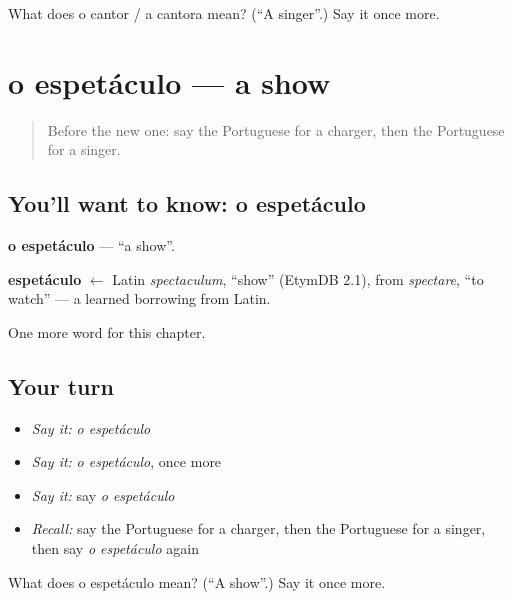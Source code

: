 \begin{tcolorbox}[breakable,colback=teal!4,colframe=teal!35!black,title={Before you move on}]
What does o cantor / a cantora mean? (\textquotedblleft{}A singer\textquotedblright{}.) Say it once more.
\end{tcolorbox}
\section[o espetáculo]{o espetáculo — a show}

\label{lesson:PT-C159-espetaculo}



\begin{quote}
Before the new one: say the Portuguese for a charger, then the Portuguese for a singer.
\end{quote}

\subsection*{You'll want to know: o espetáculo}
\textbf{o espetáculo} — \textquotedblleft{}a show\textquotedblright{}.

\begin{cousinweb}
\textbf{espetáculo} $\leftarrow$ Latin \emph{spectaculum}, \textquotedblleft{}show\textquotedblright{} (EtymDB 2.1), from \emph{spectare}, \textquotedblleft{}to watch\textquotedblright{} — a learned borrowing from Latin.
\end{cousinweb}

\begin{grammarlens}[title={What you've built}]
One more word for this chapter.
\end{grammarlens}

\subsection*{Your turn}
\begin{itemize}
\raggedright
  \item \emph{Say it:} \emph{o espetáculo}
  \item \emph{Say it:} \emph{o espetáculo}, once more
  \item \emph{Say it:} say \emph{o espetáculo}
  \item \emph{Recall:} say the Portuguese for a charger, then the Portuguese for a singer, then say \emph{o espetáculo} again
\end{itemize}

\begin{tcolorbox}[breakable,colback=teal!4,colframe=teal!35!black,title={Before you move on}]
What does o espetáculo mean? (\textquotedblleft{}A show\textquotedblright{}.) Say it once more.
\end{tcolorbox}

